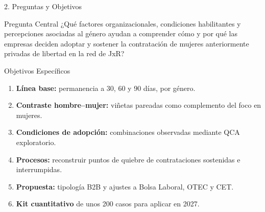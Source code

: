 \documentclass[aspectratio=169, 10pt]{beamer}
\begin{document}
\begin{frame}{2. Preguntas y Objetivos}
  \begin{block}{Pregunta Central}
    \small ¿Qué factores organizacionales, condiciones habilitantes y percepciones asociadas al género ayudan a comprender cómo y por qué las empresas deciden adoptar y sostener la contratación de mujeres anteriormente privadas de libertad en la red de JxR?
  \end{block}

  \begin{block}{Objetivos Específicos}
    \small
    \begin{enumerate}
      \item \textbf{Línea base:} permanencia a 30, 60 y 90 días, por género.
      \item \textbf{Contraste hombre--mujer:} viñetas pareadas como complemento del foco en mujeres.
      \item \textbf{Condiciones de adopción:} combinaciones observadas mediante QCA exploratorio.
      \item \textbf{Procesos:} reconstruir puntos de quiebre de contrataciones sostenidas e interrumpidas.
      \item \textbf{Propuesta:} tipología B2B y ajustes a Bolsa Laboral, OTEC y CET.
      \item \textbf{Kit cuantitativo} de unos 200 casos para aplicar en 2027.
    \end{enumerate}
  \end{block}
\end{frame}
\end{document}
